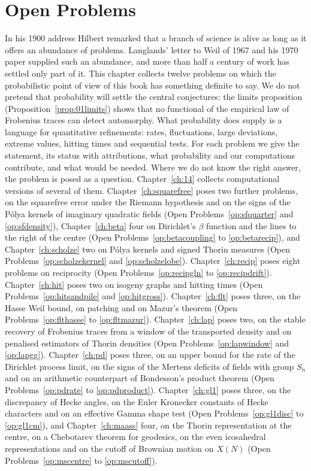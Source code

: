 \chapter{Open Problems}\label{ch:13}

In his 1900 address Hilbert remarked that a branch of science is alive as long as it offers an abundance of problems. Langlands' letter to Weil of 1967 and his 1970 paper \cite{langlands1970} supplied such an abundance, and more than half a century of work has settled only part of it. This chapter collects twelve problems on which the probabilistic point of view of this book has something definite to say. We do not pretend that probability will settle the central conjectures: the limits proposition (Proposition~\ref{prop:01limits}) shows that no functional of the empirical law of Frobenius traces can detect automorphy. What probability does supply is a language for quantitative refinements: rates, fluctuations, large deviations, extreme values, hitting times and sequential tests. For each problem we give the statement, its status with attributions, what probability and our computations contribute, and what would be needed. Where we do not know the right answer, the problem is posed as a question. Chapter~\ref{ch:14} collects computational versions of several of them. Chapter~\ref{ch:squarefree} poses two further problems, on the squarefree error under the Riemann hypothesis and on the signs of the P\'olya kernels of imaginary quadratic fields (Open Problems~\ref{op:sfquarter} and \ref{op:sfdensity}), Chapter~\ref{ch:beta} four on Dirichlet's $\beta$ function and the lines to the right of the centre (Open Problems~\ref{op:betacoupling} to \ref{op:betarecip}), and Chapter~\ref{ch:scholze} two on P\'olya kernels and signed Thorin measures (Open Problems~\ref{op:scholzekernel} and \ref{op:scholzelobe}). Chapter~\ref{ch:recip} poses eight problems on reciprocity (Open Problems~\ref{op:recipgln} to \ref{op:recipdrift}). Chapter~\ref{ch:hit} poses two on isogeny graphs and hitting times (Open Problems~\ref{op:hitsandpile} and \ref{op:hitgross}). Chapter~\ref{ch:flt} poses three, on the Hasse Weil bound, on patching and on Mazur's theorem (Open Problems~\ref{op:flthasse} to \ref{op:fltmazur}). Chapter~\ref{ch:lap} poses two, on the stable recovery of Frobenius traces from a window of the transported density and on penalised estimators of Thorin densities (Open Problems~\ref{op:lapwindow} and \ref{op:lapgg}). Chapter~\ref{ch:pd} poses three, on an upper bound for the rate of the Dirichlet process limit, on the signs of the Mertens deficits of fields with group $S_n$ and on an arithmetic counterpart of Bondesson's product theorem (Open Problems~\ref{op:pdrate} to \ref{op:pdproduct}). Chapter~\ref{ch:gl1} poses three, on the discrepancy of Hecke angles, on the Euler Kronecker constants of Hecke characters and on an effective Gamma shape test (Open Problems~\ref{op:gl1disc} to \ref{op:gl1cm}), and Chapter~\ref{ch:maass} four, on the Thorin representation at the centre, on a Chebotarev theorem for geodesics, on the even icosahedral representations and on the cutoff of Brownian motion on $X(N)$ (Open Problems~\ref{op:mscentre} to \ref{op:mscutoff}).

